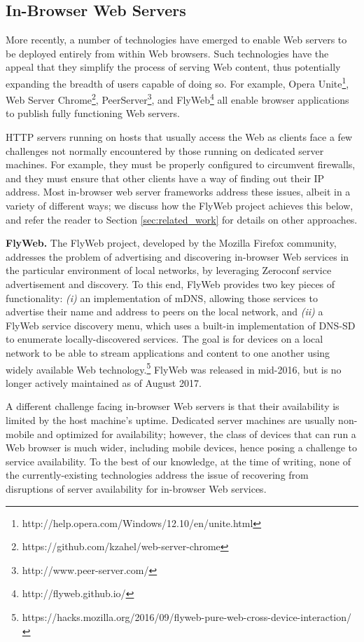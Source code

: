 \subsection{In-Browser Web Servers}
\label{sub:background_in_browser_web_servers}

More recently, a number of technologies have emerged to enable Web servers to be deployed entirely from within Web browsers.
Such technologies have the appeal that they simplify the process of serving Web content, thus potentially expanding the breadth of users capable of doing so.
For example, Opera Unite\footnote{http://help.opera.com/Windows/12.10/en/unite.html}, Web Server Chrome\footnote{https://github.com/kzahel/web-server-chrome}, PeerServer\footnote{http://www.peer-server.com/}, and FlyWeb\footnote{http://flyweb.github.io/} all enable browser applications to publish fully functioning Web servers.

HTTP servers running on hosts that usually access the Web as clients face a few challenges not normally encountered by those running on dedicated server machines.
For example, they must be properly configured to circumvent firewalls, and they must ensure that other clients have a way of finding out their IP address.
Most in-browser web server frameworks address these issues, albeit in a variety of different ways; we discuss how the FlyWeb project achieves this below, and refer the reader to Section \ref{sec:related_work} for details on other approaches.

\textbf{FlyWeb.}
The FlyWeb project, developed by the Mozilla Firefox community, addresses the problem of advertising and discovering in-browser Web services in the particular environment of local networks, by leveraging Zeroconf service advertisement and discovery.
To this end, FlyWeb provides two key pieces of functionality: 
\textit{(i)} an implementation of mDNS, allowing those services to advertise their name and address to peers on the local network, and 
\textit{(ii)} a FlyWeb service discovery menu, which uses a built-in implementation of DNS-SD to enumerate locally-discovered services.
The goal is for devices on a local network to be able to stream applications and content to one another using widely available Web technology.\footnote{https://hacks.mozilla.org/2016/09/flyweb-pure-web-cross-device-interaction/}
FlyWeb was released in mid-2016, but is no longer actively maintained as of August 2017.

A different challenge facing in-browser Web servers is that their availability is limited by the host machine's uptime.
Dedicated server machines are usually non-mobile and optimized for availability; however, the class of devices that can run a Web browser is much wider, including mobile devices, hence posing a challenge to service availability.
To the best of our knowledge, at the time of writing, none of the currently-existing technologies address the issue of recovering from disruptions of server availability for in-browser Web services.

